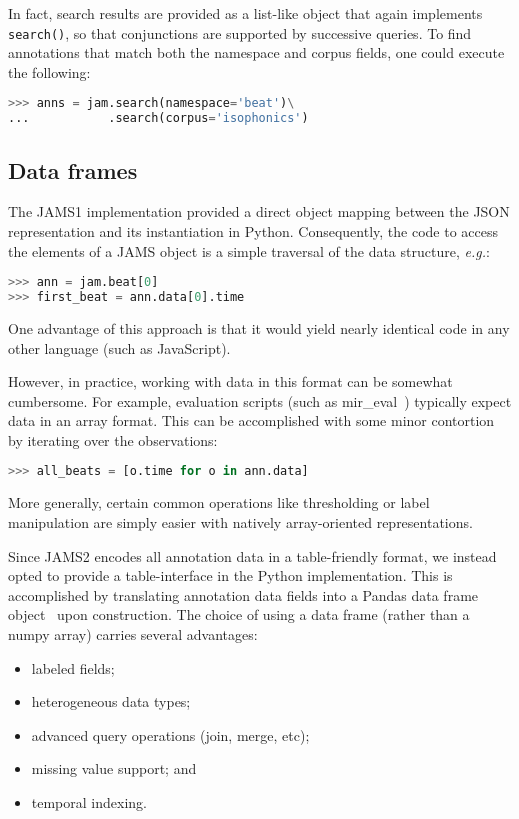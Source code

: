 \documentclass{article}
\begin{document}
In fact, search results are provided as a list-like object that again implements 
\texttt{search()}, so that conjunctions are supported by successive queries.
To find annotations that match both the namespace and corpus fields, one could execute 
the following:
\begin{lstlisting}[language=python]
>>> anns = jam.search(namespace='beat')\
...           .search(corpus='isophonics')
\end{lstlisting}


\subsection{Data frames}\label{sec:imp:dataframe}
The JAMS1 implementation provided a direct object mapping between the JSON representation
and its instantiation in Python.
Consequently, the code to access the elements of a JAMS object is a simple traversal of the
data structure, \emph{e.g.}:
\begin{lstlisting}[language=python]
>>> ann = jam.beat[0]
>>> first_beat = ann.data[0].time
\end{lstlisting}
One advantage of this approach is that it would yield nearly identical code in any other
language (such as JavaScript).

However, in practice, working with data in this format can be somewhat cumbersome.
For example, evaluation scripts (such as mir\_eval~\cite{raffel2014}) typically expect
data in an array format.  This can be accomplished with some minor contortion by
iterating over the observations:
\begin{lstlisting}[language=python]
>>> all_beats = [o.time for o in ann.data]
\end{lstlisting}
More generally, certain common operations like thresholding or
label manipulation are simply easier with natively array-oriented representations.

Since JAMS2 encodes all annotation data in a table-friendly format, we instead opted to
provide a table-interface in the Python implementation.  This is accomplished by
translating annotation data fields into a Pandas data frame
object~\cite{mckinney-proc-scipy-2010} upon construction.
The choice of using a data frame (rather than a numpy array) carries several advantages:
\begin{itemize}
    \setlength\itemsep{0em}
    \item labeled fields;
    \item heterogeneous data types;
    \item advanced query operations (join, merge, etc);
    \item missing value support; and
    \item temporal indexing.
\end{itemize}
\end{document}
